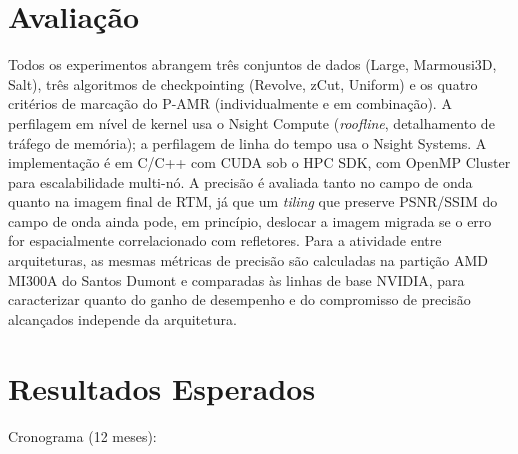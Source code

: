 \documentclass[12pt,a4paper]{article}
\newcommand{\pamr}{P\nobreakdash-AMR}
\begin{document}
\section{Avaliação}

Todos os experimentos abrangem três conjuntos de dados (Large, Marmousi3D,
Salt), três algoritmos de checkpointing (Revolve, zCut, Uniform) e os quatro
critérios de marcação do \pamr{} (individualmente e em combinação). A
perfilagem em nível de kernel usa o Nsight Compute (\emph{roofline},
detalhamento de tráfego de memória); a perfilagem de linha do tempo usa o
Nsight Systems. A implementação é em C/C++ com CUDA sob o HPC SDK, com OpenMP
Cluster para escalabilidade multi-nó. A precisão é avaliada tanto no campo de
onda quanto na imagem final de RTM, já que um \emph{tiling} que preserve
PSNR/SSIM do campo de onda ainda pode, em princípio, deslocar a imagem migrada
se o erro for espacialmente correlacionado com refletores. Para a atividade
entre arquiteturas, as mesmas métricas de precisão são calculadas na partição
AMD MI300A do Santos Dumont e comparadas às linhas de base NVIDIA, para
caracterizar quanto do ganho de desempenho e do compromisso de precisão
alcançados independe da arquitetura.

\section{Resultados Esperados}

Cronograma (12 meses):
\end{document}

